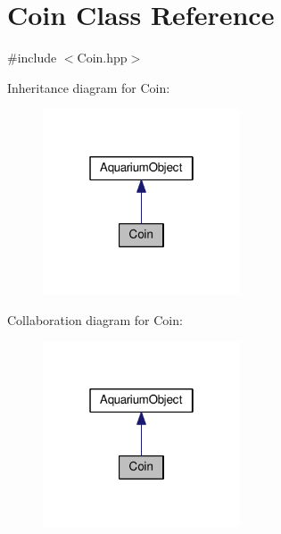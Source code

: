\hypertarget{class_coin}{}\section{Coin Class Reference}
\label{class_coin}


{\ttfamily \#include $<$Coin.\+hpp$>$}



Inheritance diagram for Coin\+:
\nopagebreak
\begin{figure}[H]
\begin{center}
\leavevmode
\includegraphics[width=166pt]{class_coin__inherit__graph}
\end{center}
\end{figure}


Collaboration diagram for Coin\+:
\nopagebreak
\begin{figure}[H]
\begin{center}
\leavevmode
\includegraphics[width=166pt]{class_coin__coll__graph}
\end{center}
\end{figure}
